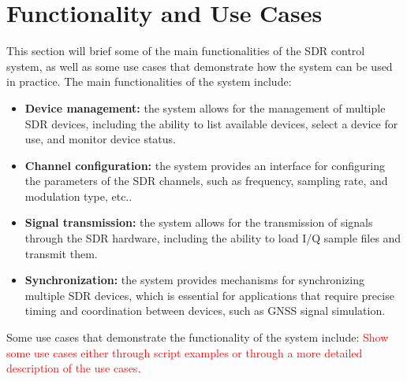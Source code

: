 \section{Functionality and Use Cases}
This section will brief some of the main functionalities of the \gls{SDR}
control system, as well as some use cases that demonstrate how the system can
be used in practice. The main functionalities of the system include:
\begin{itemize}
  \item \textbf{Device management:} the system allows for the management of multiple \gls{SDR} devices, including the ability to list available devices, select a device for use, and monitor device status.
  \item \textbf{Channel configuration:} the system provides an interface for configuring the parameters of the \gls{SDR} channels, such as frequency, sampling rate, and modulation type, etc..
  \item \textbf{Signal transmission:} the system allows for the transmission of signals through the \gls{SDR} hardware, including the ability to load \gls{I/Q} sample files and transmit them.
  \item \textbf{Synchronization:} the system provides mechanisms for synchronizing multiple \gls{SDR} devices, which is essential for applications that require precise timing and coordination between devices, such as \gls{GNSS} signal simulation.
\end{itemize}
Some use cases that demonstrate the functionality of the system include:
\textcolor{Red}{Show some use cases either through script examples or through a more detailed description of the use cases.}